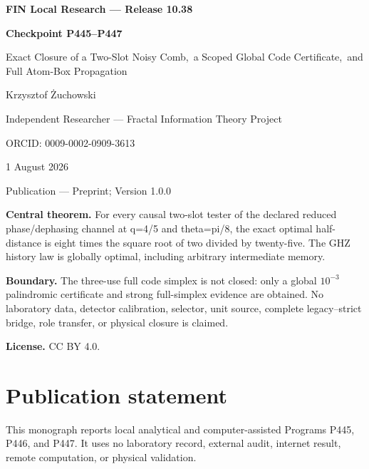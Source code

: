 \documentclass[11pt,a4paper,openany]{report}
\begin{document}
\hypersetup{pageanchor=false}
\begin{titlepage}
\centering
\vspace*{8mm}
{\Large\bfseries FIN Local Research --- Release 10.38\par}
\vspace{10mm}
{\Huge\bfseries Checkpoint P445--P447\par}
\vspace{6mm}
{\Large Exact Closure of a Two-Slot Noisy Comb,\
a Scoped Global Code Certificate,\
and Full Atom-Box Propagation\par}
\vspace{14mm}
{\Large Krzysztof \.Zuchowski\par}
\vspace{2mm}
{\normalsize Independent Researcher --- Fractal Information Theory Project\par}
\vspace{2mm}
{\normalsize ORCID: 0009-0002-0909-3613\par}
\vspace{8mm}
{\large 1 August 2026\par}
{\normalsize Publication --- Preprint; Version 1.0.0\par}
\vfill
\begin{minipage}{0.92\textwidth}
\small
\textbf{Central theorem.}
For every causal two-slot tester of the declared reduced phase/dephasing
channel at q=4/5 and theta=pi/8, the exact optimal half-distance is
eight times the square root of two divided by twenty-five.
The GHZ history law is globally optimal, including arbitrary intermediate
memory.

\medskip
\textbf{Boundary.}
The three-use full code simplex is not closed: only a global \(10^{-3}\)
palindromic certificate and strong full-simplex evidence are obtained.  No
laboratory data, detector calibration, selector, unit source, complete
legacy--strict bridge, role transfer, or physical closure is claimed.

\medskip
\textbf{License.} CC BY 4.0.
\end{minipage}
\vfill
\end{titlepage}
\hypersetup{pageanchor=true}
\chapter*{Publication statement}
This monograph reports local analytical and computer-assisted Programs P445,
P446, and P447.  It uses no laboratory record, external audit, internet
result, remote computation, or physical validation.
\tableofcontents
\clearpage
{}
\end{document}
